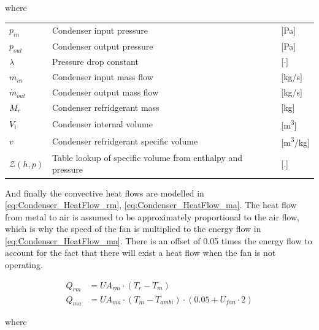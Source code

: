 where

\begin{center}
	\begin{tabular}{l p{8cm} l}
		$p_{in}$           & Condenser input pressure                                   & [\si{Pa}]          \\
		$p_{out}$          & Condenser output pressure                                  & [\si{Pa}]          \\
		$\lambda$          & Pressure drop constant                                     & [$\cdot$]          \\
		$\dot{m_{in}}$     & Condenser input mass flow                                  & [\si{kg}/\si{s}]   \\
		$\dot{m}_{out}$    & Condenser output mass flow                                 & [\si{kg}/\si{s}]   \\
		$M_{r}$            & Condenser refridgerant mass                                & [\si{kg}]          \\
		$V_{i}$            & Condenser internal volume                                  & [\si{m^3}]         \\
		$v$                & Condenser refridgerant specific volume                     & [\si{m^3}/\si{kg}] \\
		$\mathcal{Z}(h,p)$ & Table lookup of specific volume from enthalpy and pressure & [.]
	\end{tabular}
\end{center}


And finally the convective heat flows are modelled in \cref{eq:Condenser_HeatFlow_rm}, \cref{eq:Condenser_HeatFlow_ma}. The heat flow from metal to air is assumed to be approximately proportional to the air flow, which is why the speed of the fan is multiplied to the energy flow in \cref{eq:Condenser_HeatFlow_ma}. There is an offset of 0.05 times the energy flow to account for the fact that there will exist a heat flow when the fan is not operating.

\begin{align}
	Q_{rm}	 			& = U A_{rm} \cdot (T_r - T_m)							\label{eq:Condenser_HeatFlow_rm}\\
	Q_{ma}	 			& = U A_{ma} \cdot (T_m - T_{ambi})\cdot (0.05 + U_{fan} \cdot 2)				\label{eq:Condenser_HeatFlow_ma}
\end{align}

where

